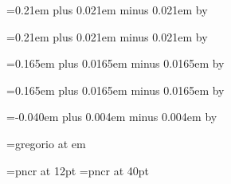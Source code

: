 \newskip\interwordspacenotes
\interwordspacenotes=0.21em plus 0.021em minus 0.021em
\multiply\interwordspacenotes by \factor

\newskip\interwordspacetext
\interwordspacetext=0.21em plus 0.021em minus 0.021em
\multiply\interwordspacetext by \factor

\newskip\bispace
\bispace=0.165em plus 0.0165em minus 0.0165em
\multiply\bispace by \factor

\newskip\trispace
\trispace=0.165em plus 0.0165em minus 0.0165em
\multiply\trispace by \factor

\newskip\punctuminclinatumshift
\punctuminclinatumshift=-0.040em plus 0.004em minus 0.004em
\multiply\punctuminclinatumshift by \factor



\newskip\barspace

\newskip\clefchangespace


\font\gregoria=gregorio at \the\factor em

\font\textfont=pncr at 12pt
\font\fontofinitial=pncr at 40pt
